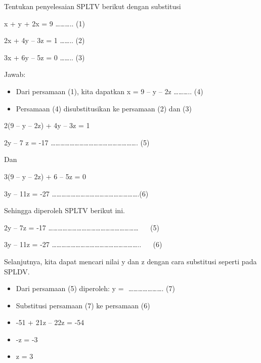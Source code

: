 \documentclass[11pt,fleqn]{book} %
\begin{document}
\begin{myEnumerate}
	\item Tentukan penyelesaian SPLTV berikut dengan substitusi \par
	x + y + 2x = 9 ……….. (1) \par
	2x + 4y – 3z = 1 …….. (2) \par
	3x + 6y – 5z = 0 …….. (3) \par
	\noindent 
	Jawab: \par
	\noindent 
	\begin{itemize}
		\item Dari persamaan (1), kita dapatkan x = 9 – y – 2z ……….. (4) \par
		\noindent 
		\item Persamaan (4) disubstitusikan ke persamaan (2) dan (3)\end{itemize}
	\par
	2(9 – y – 2z) + 4y – 3z = 1 \par
	2y – 7 z = -17 ………………………………………………. (5) \par
	Dan \par
	3(9 – y – 2z) + 6 – 5z = 0 \par
	3y – 11z = -27 ……………………………………………….(6) \par
	Sehingga diperoleh SPLTV berikut ini. \par
	2y – 7z = -17 ………………………………………………… $  $ $  $ $  $ $  $ $  $(5) \par
	3y – 11z = -27 ……………………………………………….. $  $ $  $ $  $ $  $ $  $(6) \par
	Selanjutnya, kita dapat mencari nilai y dan z dengan cara substitusi seperti pada SPLDV. \par
	\noindent 
	\begin{itemize}
		\item Dari persamaan (5) diperoleh: y = $  $ $  $…………………. (7) \par
		\noindent 
		\item Substitusi persamaan (7) ke persamaan (6)\end{itemize}
	\par
	\noindent 
	\begin{itemize}
		\item -51 + 21z – 22z = -54 \par
		\noindent 
		\item -z = -3 \par
		\noindent 
		\item z = 3\end{itemize}
	\par

\end{myEnumerate}
\end{document}
